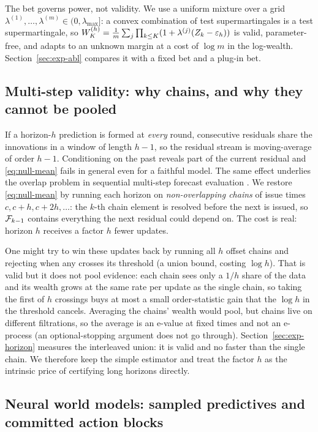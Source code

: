 The bet governs power, not validity. We use a uniform mixture over a grid
$\lambda^{(1)},\dots,\lambda^{(m)}\in(0,\lambda_{\max}]$: a convex combination of test supermartingales
is a test supermartingale, so $W^{(h)}_K=\frac1m\sum_j\prod_{k\le K}(1+\lambda^{(j)}(Z_k-\varepsilon_h))$ is valid, parameter-free,
and adapts to an unknown margin at a cost of $\log m$ in the log-wealth. Section~\ref{sec:exp-abl} compares it with a fixed bet and a
plug-in bet.

\subsection{Multi-step validity: why chains, and why they cannot be pooled}\label{sec:overlap}

If a horizon-$h$ prediction is formed at \emph{every} round, consecutive residuals share the innovations in
a window of length $h-1$, so the residual stream is moving-average of order $h-1$. Conditioning on the past
reveals part of the current residual and \eqref{eq:null-mean} fails in general even for a faithful
model. The same effect underlies the overlap problem in sequential multi-step forecast evaluation
\citep{henzi2022correction}. We restore \eqref{eq:null-mean} by running each horizon on
\emph{non-overlapping chains} of issue times $c,c+h,c+2h,\dots$: the $k$-th chain element is resolved before the next
is issued, so $\mathcal{F}_{k-1}$ contains everything the next residual could depend on. The cost is real: horizon $h$ receives a factor $h$ fewer
updates.

One might try to win these updates back by running all $h$ offset chains and rejecting when
any crosses its threshold (a union bound, costing $\log h$). That is valid but it does not pool
evidence: each chain sees only a $1/h$ share of the data and its wealth grows at the same rate per update
as the single chain, so taking the first of $h$ crossings buys at most a small order-statistic
gain that the $\log h$ in the threshold cancels. Averaging the chains' wealth would pool, but
chains live on different filtrations, so the average is an e-value at fixed times and not an e-process (an
optional-stopping argument does not go through). Section~\ref{sec:exp-horizon} measures the
interleaved union: it is valid and no faster than the single chain. We therefore keep the simple estimator
and treat the factor $h$ as the intrinsic price of certifying long horizons directly.

\subsection{Neural world models: sampled predictives and committed action blocks}\label{sec:neural}

